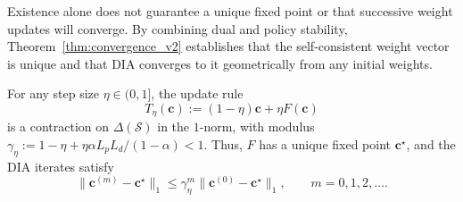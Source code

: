 \documentclass[sglanonrev]{informs4}
\providecommand{\bc}{\boldsymbol{c}}
\def\edits#1{{\color{black}#1}}
\begin{document}
\smallskip

\edits{Existence alone does not guarantee a unique fixed point or that successive weight updates will converge. By combining dual and policy stability, Theorem~\ref{thm:convergence_v2} establishes that the self-consistent weight vector is unique and that \ac{DIA} converges to it geometrically from any initial weights.}

\begin{theorem}[Convergence]
\label{thm:convergence_v2}
For any step size $\eta\in(0,1]$, the update rule
\begin{equation}
\label{eq:contraction_modulus}
T_\eta(\bc) := (1-\eta)\bc+\eta F(\bc)
\end{equation}
is a contraction on $\Delta(\mathcal S)$ in the $1$-norm, with modulus $\gamma_\eta:=1-\eta+\eta\alpha L_pL_d/(1-\alpha)<1$. Thus, $F$ has a unique fixed point $\bc^\star$, and the \ac{DIA} iterates satisfy
\begin{equation*}
\|\bc^{(m)}-\bc^\star\|_1
\leq
\gamma_\eta^m\|\bc^{(0)}-\bc^\star\|_1,
\qquad m=0,1,2,\ldots.
\end{equation*}
\end{theorem}
%
\end{document}
